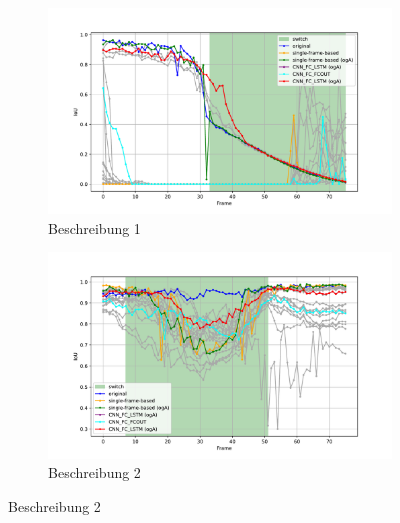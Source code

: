 \begin{figure}[H]
    \centering
    \begin{subfigure}[b]{0.49\textwidth}
        \centering
        \includegraphics[width=\textwidth]{PICs/experiments/temporalModels/plot_ious_sequence_2.pdf}
        \caption{Beschreibung 1}
        \label{fig:grafik1}
    \end{subfigure}
    \begin{subfigure}[b]{0.49\textwidth}
        \centering
        \includegraphics[width=\textwidth]{PICs/experiments/temporalModels/plot_ious_sequence_4.pdf}
        \caption{Beschreibung 2}
        \label{fig:grafik2}
    \end{subfigure}

    \vspace{1em} %


\end{figure}
